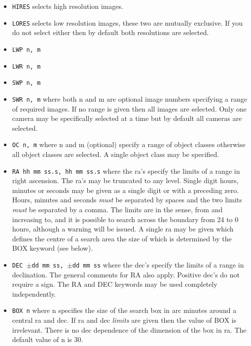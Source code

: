 \begin{itemize}

\item {\tt HIRES} selects high resolution images.

\item {\tt LORES} selects low resolution images, these two are mutually
exclusive.
If you do not select either then by default both resolutions are selected.

\item {\tt LWP n, m}

\item {\tt LWR n, m}

\item {\tt SWP n, m}

\item {\tt SWR n, m} where both n and m are optional image numbers specifying a range
of required images. If no range is given then all images are selected.
Only one camera may be specifically selected at a time but by default all 
cameras are selected. 

\item {\tt OC n, m} where n and m (optional) specify a range of object classes
otherwise 
all object classes are selected. A single object class may be specified.

\item {\tt RA hh mm ss.s, hh mm ss.s} where the ra's specify the limits of a range in
right ascension.
The ra's may be truncated to any level. Single digit hours, minutes or seconds
may be given as a single digit or with a preceding zero. Hours, minutes and
seconds {\it must} be separated by spaces and the two limits {\it must} be
separated by a comma. The limits are in the sense, from and increasing to, 
and it is possible to search across the boundary from 24 to 0 hours, although
a warning will be issued.
A single ra may be given which defines the centre of
a search area the size of which is determined by the BOX keyword (see below).

\item {\tt DEC $\pm$dd mm ss, $\pm$dd mm ss} where the dec's specify the limits of 
a range in
declination. The general comments for RA also apply. Positive dec's do not
require a sign.
The RA and DEC keywords may be used completely independently.

\item {\tt BOX n} where n 
specifies the size of the search box in arc minutes around a central
ra and dec. If ra and dec {\it limits} are given then the value of BOX is
irrelevant. There is no dec dependence of the dimension of the box in ra.
The default value of n is 30.


\end{itemize}
